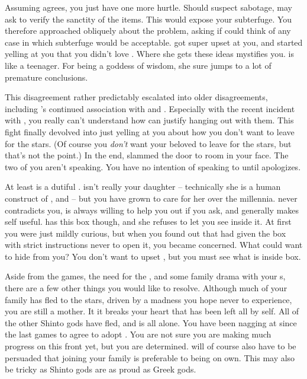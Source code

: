 \documentclass[char]{guardians}
\begin{document}
Assuming \cOsiris{} agrees, you just have one more hurtle. Should \cZeus{} suspect sabotage, \cZeus{\they} may ask \cAthena{} to verify the sanctity of the items. This would expose your subterfuge. You therefore approached \cAthena{} obliquely about the problem, asking if \cAthena{\they} could think of any case in which subterfuge would be acceptable. \cAthena{} got super upset at you, and started yelling at you that you didn't love \cZeus{}. Where she gets these ideas mystifies you. \cAthena{\They} is like a teenager. For being a goddess of wisdom, she sure jumps to a lot of premature conclusions.

This disagreement rather predictably escalated into older disagreements, including \cAthena{}'s continued association with \cVal{} and \cFenrir{}. Especially with the recent incident with \cVal{}, you really can't understand how \cAthena{} can justify hanging out with them.  This fight finally devolved into \cAthena{} just yelling at you about how you don't want \cAthena{\them} to leave for the stars. (Of course you \emph{don't} want your beloved \cAthena{\offspring} to leave for the stars, but that's not the point.) In the end, \cAthena{} slammed the door to \cAthena{\them} room in your face. The two of you aren't speaking. You have no intention of speaking to \cAthena{\them} until \cAthena{\they} apologizes.

At least \cPandora{} is a dutiful \cPandora{\offspring}. \cPandora{\They} isn't really your daughter -- technically she is a human construct of \cAthena{}, \cHephaestus{} and \cZeus{} -- but you have grown to care for her over the millennia. \cPandora{} never contradicts you, \cPandora{\they} is always willing to help you out if you ask, and generally makes \cPandora{\them}self useful. \cPandora{\They} has this box though, and she refuses to let you see inside it. At first you were just mildly curious, but when you found out that \cZeus{} had given \cPandora{\them} the box with strict instructions never to open it, you became concerned. What could \cZeus{} want to hide from you? You don't want to upset \cPandora{}, but you must see what is inside \cPandora{\them} box.

Aside from the games, the need for the \stone{}, and some family drama with your \cAthena{\offspring}s, there are a few other things you would like to resolve. Although much of your family has fled to the stars, driven by a madness you hope never to experience, you are still a mother. It it breaks your heart that \cAmaterasu{} has been left all by \cAmaterasu{\them}self. All of the other Shinto gods have fled, and \cAmaterasu{\they} is all alone. You have been nagging at \cZeus{} since the last games to agree to adopt \cAmaterasu{}. You are not sure you are making much progress on this front yet, but you are determined. \cAmaterasu{} will of course also have to be persuaded that joining your family is preferable to being on \cAmaterasu{\them} own. This may also be tricky as Shinto gods are as proud as Greek gods.
\end{document}
